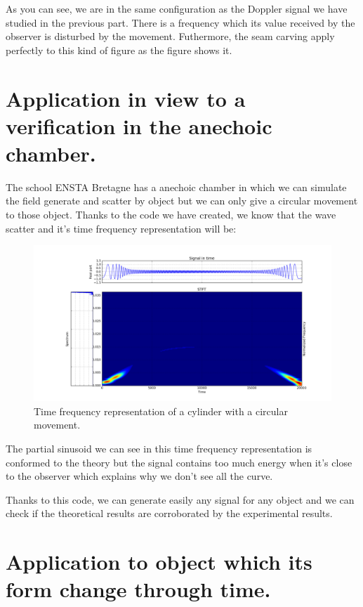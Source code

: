 As you can see, we are in the same configuration as the Doppler signal we have studied in the previous part. There is a frequency which its value received by the observer is disturbed by the movement. Futhermore, the seam carving apply perfectly to this kind of figure as the figure \label{SpectrogramObjMov_LawFound} shows it.

\section{Application in view to a verification in the anechoic chamber.}

The school ENSTA Bretagne has a anechoic chamber in which we can simulate the field generate and scatter by object but we can only give a circular movement to those object. Thanks to the code we have created, we know that the wave scatter and it's time frequency representation will be:

\begin{figure}[H]
\centering
    \includegraphics[scale=0.35,angle=0]{Images/TFR3.png}
    \caption{Time frequency representation of a cylinder with a circular movement.}
    \label{fig:TFR3}
\end{figure}

The partial sinusoid we can see in this time frequency representation is conformed to the theory but the signal contains too much energy when it's close to the observer which explains why we don't see all the curve.

Thanks to this code, we can generate easily any signal for any object and we can check if the theoretical results are corroborated by the experimental results.

\section{Application to object which its form change through time.}